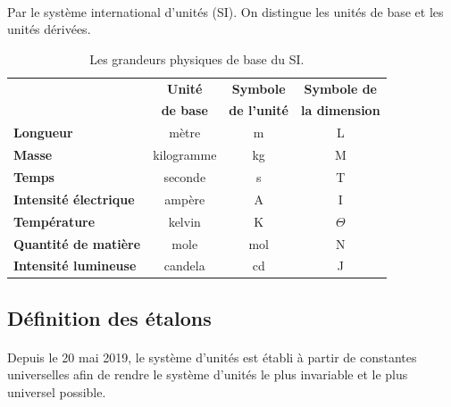 \documentclass{article}
\begin{document}
            \paragraph{}
            Par le système international d'unités (SI). On distingue les unités de base et les unités dérivées.
            \begin{table}[H]
            \begin{center}
                \caption{Les grandeurs physiques de base du SI.}
                \begin{tabular}{l|c|c|c}
                    \textbf{} & \textbf{Unité} & \textbf{Symbole} & \textbf{Symbole de}\\
                    \textbf{} & \textbf{de base} & \textbf{de l'unité} & \textbf{la dimension}\\
                    \hline
                    \textbf{Longueur} & mètre & \si{\meter} & L\\
                    \textbf{Masse} & kilogramme & \si{\kilogram} & M\\
                    \textbf{Temps} & seconde & \si{\second} & T\\
                    \textbf{Intensité électrique} & ampère & \si{\ampere} & I\\
                    \textbf{Température} & kelvin & \si{\kelvin} & $\Theta$\\
                    \textbf{Quantité de matière} & mole & \si{\mol} & N\\
                    \textbf{Intensité lumineuse} & candela & \si{\candela} & J\\
                \end{tabular}
            \end{center}
            \end{table}

        \subsection{Définition des étalons}
            \paragraph{}
            Depuis le 20 mai 2019, le système d'unités est établi à partir de constantes universelles afin de rendre le système d'unités le plus invariable et le plus universel possible.
\end{document}
